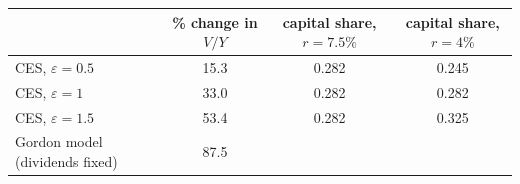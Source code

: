 \begin{tabular}{lccc}\toprule
 & \% change in $V/Y$ & capital share, $r=7.5\%$ & capital share, $r=4\%$\\\midrule
CES, $\varepsilon=0.5$ & 15.3 & 0.282 & 0.245\\
CES, $\varepsilon=1$ & 33.0 & 0.282 & 0.282\\
CES, $\varepsilon=1.5$ & 53.4 & 0.282 & 0.325\\
Gordon model (dividends fixed) & 87.5 & & \\
\bottomrule\end{tabular}
